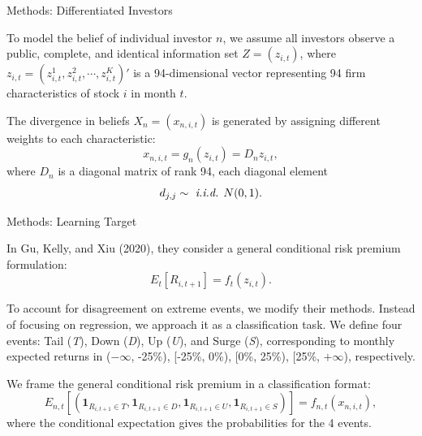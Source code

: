 \documentclass[11pt, aspectratio=169]{beamer}
\newenvironment{wideitemize}{\itemize\addtolength{\itemsep}{10pt}}{\enditemize}
\begin{document}
\begin{frame}{Methods: Differentiated Investors}
    \bigskip
    \begin{wideitemize}
    \item To model the belief of individual investor $n$, we assume all investors observe a \alert{public, complete, and identical} information set $Z = (z_{i, t})$, where $z_{i,t}=(z_{i,t}^{1},z_{i,t}^{2},\cdots,z_{i,t}^{K})'$ is a 94-dimensional vector representing 94 firm characteristics of stock $i$ in month $t$. 
    \item The divergence in beliefs $X_{n} = (x_{n,i,t})$ is generated by assigning different weights to each characteristic:
    \begin{equation*}
        x_{n,i,t} = g_n(z_{i,t}) = D_{n}z_{i,t},
    \end{equation*}
    where $D_{n}$ is a diagonal matrix of rank 94, each diagonal element
    \begin{equation*}
        d_{j,j} \sim\text{ \textit{i.i.d.} } N(0,1).
    \end{equation*}
    \end{wideitemize}
\end{frame}

\begin{frame}{Methods: Learning Target}
    \bigskip
    \begin{wideitemize}
    \item In Gu, Kelly, and Xiu (2020), they consider a general conditional risk premium formulation:
    \begin{equation*}
        E_t[R_{i,t+1}] = f_t(z_{i,t}).
    \end{equation*}
    \item To account for disagreement on extreme events, we modify their methods. \alert{Instead of focusing on regression, we approach it as a classification task}. We define four events: Tail (\textit{T}), Down (\textit{D}), Up (\textit{U}), and Surge (\textit{S}), corresponding to monthly expected returns in ($-\infty$, -25\%), [-25\%, 0\%), [0\%, 25\%), [25\%, $+\infty$), respectively.
    \item We frame the general conditional risk premium in a \alert{classification format}:
    \begin{equation*}
        E_{n,t}[(\mathbf{1}_{R_{i,t+1}\in T},
                 \mathbf{1}_{R_{i,t+1}\in D},
                 \mathbf{1}_{R_{i,t+1}\in U},
                 \mathbf{1}_{R_{i,t+1}\in S})] = f_{n,t}(x_{n,i,t}),
    \end{equation*}
    where the conditional expectation gives the probabilities for the 4 events.
    \end{wideitemize}
\end{frame}
\end{document}

